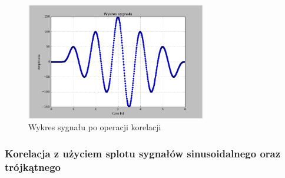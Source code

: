 \documentclass{article}
\begin{document}
{{    \begin{figure}[h!]
    \centering
    \includegraphics[width=0.7\textwidth]{img/kor_2.png}
    \caption{Wykres sygnału po operacji korelacji}
    \end{figure}
    \FloatBarrier
    }

    \subsubsection{Korelacja z użyciem splotu sygnałów sinusoidalnego oraz trójkątnego} \label{eksperyment:korelacja6}{

}}
\end{document}
